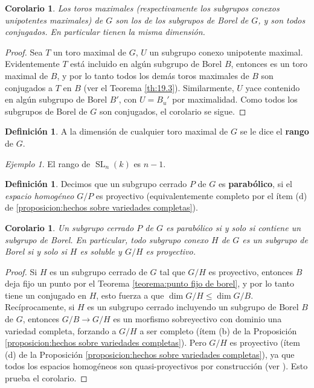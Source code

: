 \documentclass[spanish,12pt]{amsart}
\newtheorem{corollary}[theorem]{Corolario}
\theoremstyle{definition}
\newtheorem{definition}[theorem]{Definición}
\theoremstyle{remark}
\newtheorem{example}[theorem]{Ejemplo}
\numberwithin{equation}{section}
\begin{document}
\begin{corollary}\label{corolario:los toros maximales de G son toros maximales de un Borel y son todos conjugados entre si}
Los toros maximales (respectivamente los subgrupos conexos unipotentes maximales) de $G$ son los de los subgrupos de Borel de $G$, y son todos conjugados. En particular tienen la misma dimensión.
\end{corollary}
\begin{proof}
Sea $T$ un toro maximal de $G$, $U$ un subgrupo conexo unipotente maximal. Evidentemente $T$ está incluido en algún subgrupo de Borel $B$, entonces es un toro maximal de $B$, y por lo tanto todos los demás toros maximales de $B$ son conjugados a $T$ en $B$ (ver el Teorema \ref{th:19.3}). Similarmente, $U$ yace contenido en algún subgrupo de Borel $B'$, con $U = B_u '$ por maximalidad. Como todos los subgrupos de Borel de $G$ son conjugados, el corolario se sigue.
\end{proof}

\begin{definition}
A la dimensión de cualquier toro maximal de $G$ se le dice el \textbf{rango} de $G$.
\end{definition}

\begin{example}
El rango de $\operatorname{SL}_n (k)$ es $n-1$.
\end{example}

\begin{definition}
Decimos que un subgrupo cerrado $P$ de $G$ es \textbf{parabólico}, si el \textit{espacio homogéneo} $G/P$ es proyectivo (equivalentemente completo por el ítem (d) de \ref{proposicion:hechos sobre variedades completas}).
\end{definition}

\begin{corollary}\label{corolario:un subgrupo cerrado es parabolico si y solo si incluye un subgrupo de borel}
Un subgrupo cerrado $P$ de $G$ es parabólico si y solo si contiene un subgrupo de Borel. En particular, todo subgrupo conexo $H$ de $G$ es un subgrupo de Borel si y solo si $H$ es soluble y $G/H$ es proyectivo.
\end{corollary}
\begin{proof}
Si $H$ es un subgrupo cerrado de $G$ tal que $G/H$ es proyectivo, entonces $B$ deja fijo un punto por el Teorema \ref{teorema:punto fijo de borel}, y por lo tanto tiene un conjugado en $H$, esto fuerza a que $\dim G/H \leq \dim G/B$. Recíprocamente, si $H$ es un subgrupo cerrado incluyendo un subgrupo de Borel $B$ de $G$, entonces $G/B \to G/H$ es un morfismo sobreyectivo con dominio una variedad completa, forzando a $G/H$ a ser completo (ítem (b) de la Proposición \ref{proposicion:hechos sobre variedades completas}). Pero $G/H$ es proyectivo (ítem (d) de la Proposición \ref{proposicion:hechos sobre variedades completas}), ya que todos los espacios homogéneos son quasi-proyectivos por construcción (ver \cite[\S 11.3]{humphreys2012linearAlgebraicGroups}). Esto prueba el corolario.
\end{proof}
\end{document}
